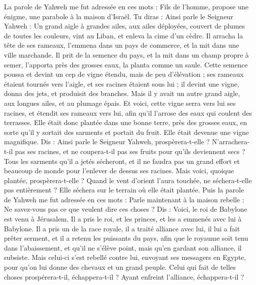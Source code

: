 \begin{multicols}{2}
\VerseOne{}La parole de Yahweh me fut adressée en ces mots :
Fils de l’homme, propose une énigme, une parabole à la maison d'Israël.
Tu diras : Ainsi parle le Seigneur Yahweh : Un grand aigle à grandes ailes, aux ailes déployées, couvert de plumes de toutes les couleurs, vint au Liban, et enleva la cime d'un cèdre.
Il arracha la tête de ses rameaux, l’emmena dans un pays de commerce, et la mit dans une ville marchande.
Il prit de la semence du pays, et la mit dans un champ propre à semer, l’apporta près des grosses eaux, la planta comme un saule.
Cette semence poussa et devint un cep de vigne étendu, mais de peu d’élévation ; ses rameaux étaient tournés vers l’aigle, et ses racines étaient sous lui ; il devint une vigne, donna des jets, et produisit des branches.
Mais il y avait un autre grand aigle, aux longues ailes, et au plumage épais. Et voici, cette vigne serra vers lui ses racines, et étendit ses rameaux vers lui, afin qu'il l'arrose des eaux qui coulent des terrasses.
Elle était donc plantée dans une bonne terre, près des grosses eaux, en sorte qu'il y sortait des sarments et portait du fruit. Elle était devenue une vigne magnifique.
Dis : Ainsi parle le Seigneur Yahweh, prospèrera-t-elle ? N’arrachera-t-il pas ses racines, et ne coupera-t-il pas ses fruits pour qu’ils deviennent secs ? Tous les sarments qu'il a jetés sécheront, et il ne faudra pas un grand effort et beaucoup de monde pour l'enlever de dessus ses racines.
Mais voici, quoique plantée, prospèrera-t-elle ? Quand le vent d'orient l'aura touchée, ne séchera-t-elle pas entièrement ? Elle séchera sur le terrain où elle était plantée.
Puis la parole de Yahweh me fut adressée en ces mots :
Parle maintenant à la maison rebelle : Ne savez-vous pas ce que veulent dire ces choses ? Dis : Voici, le roi de Babylone est venu à Jérusalem. Il a pris le roi, et les princes, et les a emmenés avec lui à Babylone.
Il a pris un de la race royale, il a traité alliance avec lui, il lui a fait prêter serment, et il a retenu les puissants du pays,
afin que le royaume soit tenu dans l’abaissement, et qu'il ne s'élève point, mais qu'en gardant son alliance, il subsiste.
Mais celui-ci s'est rebellé contre lui, envoyant ses messagers en Egypte, pour qu’on lui donne des chevaux et un grand peuple. Celui qui fait de telles choses prospérera-t-il, échappera-t-il ? Ayant enfreint l'alliance, échappera-t-il ?

\end{multicols}
